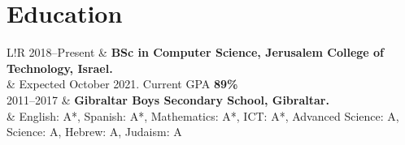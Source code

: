 \documentclass{article}
\newcommand\VRule{\color{lightgray}\vrule width 0.4pt}
\begin{document}
\section*{Education}
\begin{tabular}{L!{\VRule}R}
	2018--Present & \textbf{BSc in Computer Science, Jerusalem College of Technology, Israel.} \\
	              & Expected October 2021. Current GPA \textbf{89\%} \vspace{4pt} \\
	2011--2017    & \textbf{Gibraltar Boys Secondary School, Gibraltar.} \vspace{4pt} \\
	              & English: A*, Spanish: A*, Mathematics: A*, ICT: A*, Advanced Science: A\*, Science: A, Hebrew: A, Judaism: A
\end{tabular}
\end{document}
